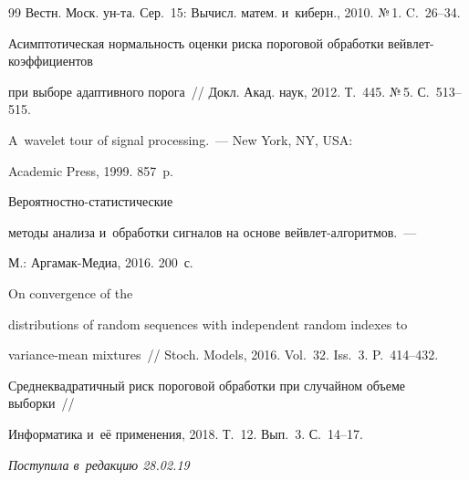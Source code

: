 {{\begin{thebibliography}{99}
Вестн. Моск. ун-та. Сер.~15: Вычисл. матем. и~киберн., 2010. №\,1. C.~26--34.





Асимптотическая нормальность оценки риска пороговой обработки вейв\-лет-ко\-эф\-фи\-ци\-ен\-тов 

при выборе адаптивного порога~/\!\!/ Докл. Акад. наук, 2012. Т.~445. №\,5. С.~513--515.




 A~wavelet tour of signal processing.~--- New York, NY, USA: 

Academic Press, 1999. 857~p.




 Вероятностно-статистические 

методы анализа и~обработки сигналов на основе вейв\-лет-ал\-го\-рит\-мов.~--- 

М.: Аргамак-Медиа, 2016. 200~с.



\pagebreak




 On convergence of the 

distributions of random sequences with independent random indexes to 

variance-mean mixtures~/\!\!/ Stoch. Models, 2016. Vol.~32. Iss.~3. P.~414--432.





Среднеквадратичный риск пороговой обработки при случайном объеме выборки~/\!\!/ 

Информатика и~её применения, 2018. Т.~12. Вып.~3. С.~14--17.

        \end{thebibliography}

} }





\vspace*{-7pt}



\hfill{\small\textit{Поступила в~редакцию 28.02.19}}









